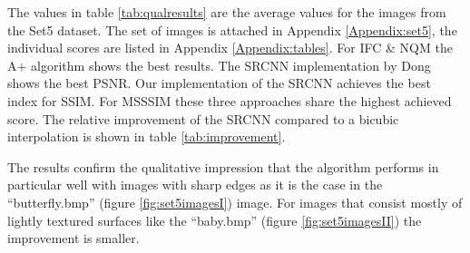 \documentclass[
			fontsize = 12pt,
			paper = a4
			]
			{scrartcl}%
\newcommand{\?}{\ensuremath{^\texttt{\textbf [CITATION~NEEDED]}}}
\begin{document}
The values in table \ref{tab:qualresults} are the average values for the images from the Set5 dataset. The set of images is attached in Appendix \ref{Appendix:set5}, the individual scores are listed in Appendix \ref{Appendix:tables}. For IFC \& NQM the A+ algorithm shows the best results. The SRCNN implementation by Dong shows the best PSNR. Our implementation of the SRCNN achieves the best index for SSIM. For MSSSIM these three approaches share the highest achieved score. The relative improvement of the SRCNN compared to a bicubic interpolation is shown in table \ref{tab:improvement}. 

The results confirm the qualitative impression that the algorithm performs in particular well with images with sharp edges as it is the case in the \enquote{butterfly.bmp} (figure \ref{fig:set5imagesI}) image. For images that consist mostly of lightly textured surfaces like the \enquote{baby.bmp} (figure \ref{fig:set5imagesII}) the improvement is smaller. 
\end{document}
